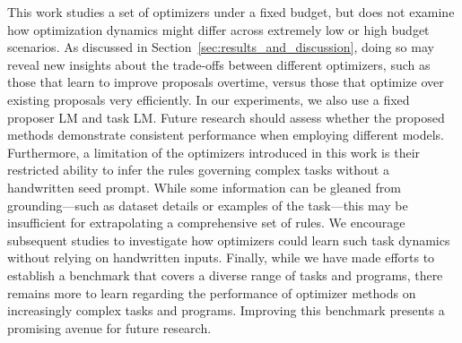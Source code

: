 This work studies a set of optimizers under a fixed budget, but does not examine how optimization dynamics might differ across extremely low or high budget scenarios. As discussed in Section~\ref{sec:results_and_discussion}, doing so may reveal new insights about the trade-offs between different optimizers, such as those that learn to improve proposals overtime, versus those that optimize over existing proposals very efficiently.
In our experiments, we also use a fixed proposer LM and task LM. Future research should assess whether the proposed methods demonstrate consistent performance when employing different models. 
Furthermore, a limitation of the optimizers introduced in this work is their restricted ability to infer the rules governing complex tasks without a handwritten seed prompt. While some information can be gleaned from grounding—such as dataset details or examples of the task—this may be insufficient for extrapolating a comprehensive set of rules. We encourage subsequent studies to investigate how optimizers could learn such task dynamics without relying on handwritten inputs.
Finally, while we have made efforts to establish a benchmark that covers a diverse range of tasks and programs, there remains more to learn regarding the performance of optimizer methods on increasingly complex tasks and programs. Improving this benchmark presents a promising avenue for future research.




